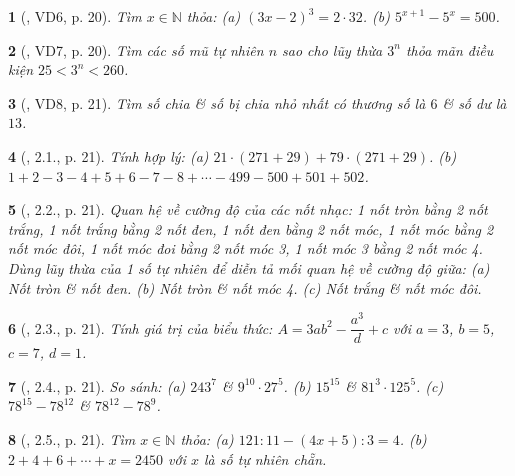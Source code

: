 \documentclass{article}
\newtheorem{baitoan}{}
\begin{document}
\begin{baitoan}[\cite{Binh_boi_duong_Toan_6_tap_1}, VD6, p. 20]
	Tìm $x\in\mathbb{N}$ thỏa: (a) $(3x - 2)^3 = 2\cdot32$. (b) $5^{x+1} - 5^x = 500$.
\end{baitoan}

\begin{baitoan}[\cite{Binh_boi_duong_Toan_6_tap_1}, VD7, p. 20]
	Tìm các số mũ tự nhiên $n$ sao cho lũy thừa $3^n$ thỏa mãn điều kiện $25 < 3^n < 260$.
\end{baitoan}

\begin{baitoan}[\cite{Binh_boi_duong_Toan_6_tap_1}, VD8, p. 21]
	Tìm số chia \& số bị chia nhỏ nhất có thương số là $6$ \& số dư là $13$.
\end{baitoan}

\begin{baitoan}[\cite{Binh_boi_duong_Toan_6_tap_1}, 2.1., p. 21]
	Tính hợp lý: (a) $21\cdot(271 + 29) + 79\cdot(271 + 29)$. (b) $1 + 2 - 3 - 4 + 5 + 6 - 7 - 8 + \cdots - 499 - 500 + 501 + 502$.
\end{baitoan}

\begin{baitoan}[\cite{Binh_boi_duong_Toan_6_tap_1}, 2.2., p. 21]
	Quan hệ về cường độ của các nốt nhạc: 1 nốt tròn bằng 2 nốt trắng, 1 nốt trắng bằng 2 nốt đen, 1 nốt đen bằng 2 nốt móc, 1 nốt móc bằng 2 nốt móc đôi, 1 nốt móc đoi bằng 2 nốt móc 3, 1 nốt móc 3 bằng 2 nốt móc 4. Dùng lũy thừa của 1 số tự nhiên để diễn tả mối quan hệ về cường độ giữa: (a) Nốt tròn \& nốt đen. (b) Nốt tròn \& nốt móc 4. (c) Nốt trắng \& nốt móc đôi.
\end{baitoan}

\begin{baitoan}[\cite{Binh_boi_duong_Toan_6_tap_1}, 2.3., p. 21]
	Tính giá trị của biểu thức: $A = 3ab^2 -  \dfrac{a^3}{d} + c$ với $a = 3$, $b = 5$, $c = 7$, $d = 1$.
\end{baitoan}

\begin{baitoan}[\cite{Binh_boi_duong_Toan_6_tap_1}, 2.4., p. 21]
	So sánh: (a) $243^7$ \& $9^{10}\cdot27^5$. (b) $15^{15}$ \& $81^3\cdot125^5$. (c) $78^{15} - 78^{12}$ \& $78^{12} - 78^9$.
\end{baitoan}

\begin{baitoan}[\cite{Binh_boi_duong_Toan_6_tap_1}, 2.5., p. 21]
	Tìm $x\in\mathbb{N}$ thỏa: (a) $121:11 - (4x + 5):3 = 4$. (b) $2 + 4 + 6 + \cdots + x = 2450$ với $x$ là số tự nhiên chẵn.
\end{baitoan}
\end{document}
